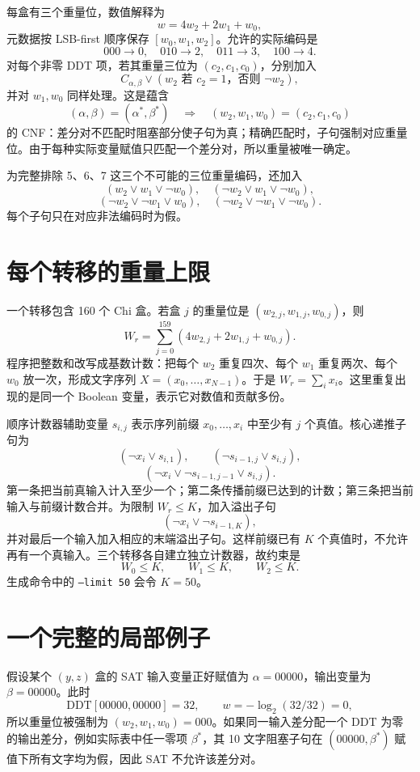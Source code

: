 \documentclass[UTF8,a4paper]{ctexart}
\begin{document}
每盒有三个重量位，数值解释为
\[
w=4w_2+2w_1+w_0,
\]
元数据按 LSB-first 顺序保存 \([w_0,w_1,w_2]\)。允许的实际编码是
\[
000\to0,\quad010\to2,\quad011\to3,\quad100\to4.
\]
对每个非零 DDT 项，若其重量三位为 \((c_2,c_1,c_0)\)，分别加入
\[
C_{\alpha,\beta}\lor(w_2\text{ 若 }c_2=1\text{，否则 }\neg w_2),
\]
并对 \(w_1,w_0\) 同样处理。这是蕴含
\[
(\alpha,\beta)=(\alpha^*,\beta^*)\quad\Longrightarrow\quad
(w_2,w_1,w_0)=(c_2,c_1,c_0)
\]
的 CNF：差分对不匹配时阻塞部分使子句为真；精确匹配时，子句强制对应重量位。由于每种实际变量赋值只匹配一个差分对，所以重量被唯一确定。

为完整排除 5、6、7 这三个不可能的三位重量编码，还加入
\[
(w_2\lor w_1\lor\neg w_0),\quad
(\neg w_2\lor w_1\lor\neg w_0),
\]
\[
(\neg w_2\lor\neg w_1\lor w_0),\quad
(\neg w_2\lor\neg w_1\lor\neg w_0).
\]
每个子句只在对应非法编码时为假。

\section{每个转移的重量上限}
一个转移包含 160 个 Chi 盒。若盒 \(j\) 的重量位是 \((w_{2,j},w_{1,j},w_{0,j})\)，则
\[
W_r=\sum_{j=0}^{159}(4w_{2,j}+2w_{1,j}+w_{0,j}).
\]
程序把整数和改写成基数计数：把每个 \(w_2\) 重复四次、每个 \(w_1\) 重复两次、每个 \(w_0\) 放一次，形成文字序列 \(X=(x_0,\ldots,x_{N-1})\)。于是 \(W_r=\sum_i x_i\)。这里重复出现的是同一个 Boolean 变量，表示它对数值和贡献多份。

顺序计数器辅助变量 \(s_{i,j}\) 表示序列前缀 \(x_0,\ldots,x_i\) 中至少有 \(j\) 个真值。核心递推子句为
\[
(\neg x_i\lor s_{i,1}),\qquad
(\neg s_{i-1,j}\lor s_{i,j}),
\]
\[
(\neg x_i\lor\neg s_{i-1,j-1}\lor s_{i,j}).
\]
第一条把当前真输入计入至少一个；第二条传播前缀已达到的计数；第三条把当前输入与前缀计数合并。为限制 \(W_r\le K\)，加入溢出子句
\[
(\neg x_i\lor\neg s_{i-1,K}),
\]
并对最后一个输入加入相应的末端溢出子句。这样前缀已有 \(K\) 个真值时，不允许再有一个真输入。三个转移各自建立独立计数器，故约束是
\[
W_0\le K,\qquad W_1\le K,\qquad W_2\le K.
\]
生成命令中的 \texttt{--limit 50} 会令 \(K=50\)。

\section{一个完整的局部例子}
假设某个 \((y,z)\) 盒的 SAT 输入变量正好赋值为 \(\alpha=00000\)，输出变量为 \(\beta=00000\)。此时
\[
\mathrm{DDT}[00000,00000]=32,
\qquad w=-\log_2(32/32)=0,
\]
所以重量位被强制为 \((w_2,w_1,w_0)=000\)。如果同一输入差分配一个 DDT 为零的输出差分，例如实际表中任一零项 \(\beta^*\)，其 10 文字阻塞子句在 \((00000,\beta^*)\) 赋值下所有文字均为假，因此 SAT 不允许该差分对。
\end{document}
